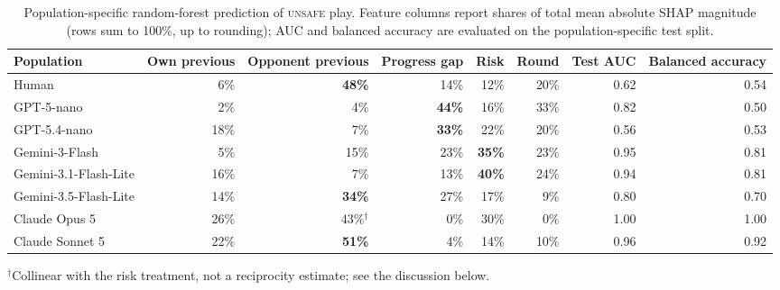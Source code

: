 \documentclass[sigconf]{aamas}
\newcommand{\Unsafe}{\textsc{unsafe}}
\begin{document}
\begin{table}[t]
    \caption{Population-specific random-forest prediction of \Unsafe{}
    play. Feature columns report shares of total mean absolute SHAP
    magnitude (rows sum to 100\%, up to rounding); AUC and balanced
    accuracy are evaluated on the population-specific test split.}
    \label{tab:feature-importance}
    \centering
    \footnotesize
    \setlength{\tabcolsep}{4.5pt}
    \begin{tabular}{@{}lrrrrrrr@{}}
        \toprule
        Population
        & Own previous
        & Opponent previous
        & Progress gap
        & Risk
        & Round
        & Test AUC
        & Balanced accuracy \\
        \midrule
        Human                   & 6\%  & \textbf{48\%} & 14\% & 12\%          & 20\% & 0.62 & 0.54 \\
        GPT-5-nano              & 2\%  & 4\%           & \textbf{44\%} & 16\% & 33\% & 0.82 & 0.50 \\
        GPT-5.4-nano            & 18\% & 7\%           & \textbf{33\%} & 22\% & 20\% & 0.56 & 0.53 \\
        Gemini-3-Flash          & 5\%  & 15\%          & 23\% & \textbf{35\%} & 23\% & 0.95 & 0.81 \\
        Gemini-3.1-Flash-Lite   & 16\% & 7\%           & 13\% & \textbf{40\%} & 24\% & 0.94 & 0.81 \\
        Gemini-3.5-Flash-Lite   & 14\% & \textbf{34\%} & 27\% & 17\%          & 9\%  & 0.80 & 0.70 \\
        Claude Opus 5           & 26\% & 43\%$^\dagger$ & 0\% & 30\%         & 0\%  & 1.00 & 1.00 \\
        Claude Sonnet 5         & 22\% & \textbf{51\%} & 4\%  & 14\%          & 10\% & 0.96 & 0.92 \\
        \bottomrule
    \end{tabular}

    \vspace{2pt}
    {\footnotesize $^\dagger$Collinear with the risk treatment, not a
    reciprocity estimate; see the discussion below.\par}
\end{table}
\end{document}
